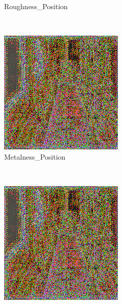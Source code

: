 \begin{figure}[h!]
\begin{subfigure}[b]{0.175\textwidth}
     \caption{Roughness_Position}
     \label{subfig:quadruple_input_base_normal_emissive_roughness_position}
    \end{subfigure}
    \\ \vspace{0.2cm} %
    \begin{subfigure}[b]{0.175\textwidth}
     \includegraphics[width=\textwidth]{figures/result/quadruple/normal_emissive_metalness_position/2.png}
     \caption{Metalness_Position}
    \end{subfigure}
    ~
    \begin{subfigure}[b]{0.175\textwidth}
     \includegraphics[width=\textwidth]{figures/result/quadruple/normal_emissive_metalness_position/2.png}

\end{subfigure}
\end{figure}
